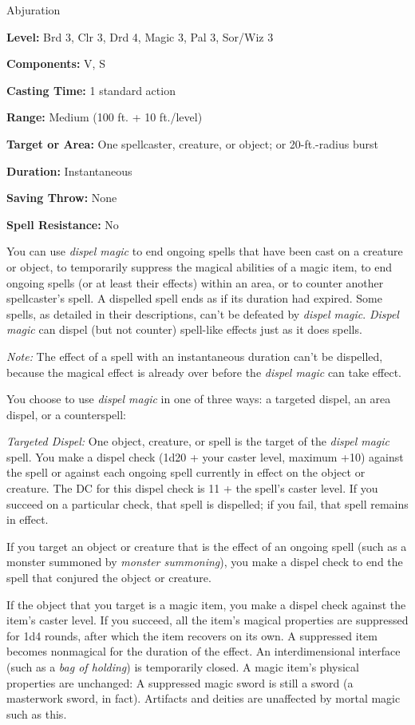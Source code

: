 
Abjuration

\textbf{Level:} Brd 3, Clr 3, Drd 4, Magic 3, Pal 3, Sor/Wiz 3

\textbf{Components:} V, S

\textbf{Casting Time:} 1 standard action

\textbf{Range:} Medium (100 ft. + 10 ft./level)

\textbf{Target or Area:} One spellcaster, creature, or object; or 20-ft.-radius 
burst

\textbf{Duration:} Instantaneous

\textbf{Saving Throw:} None

\textbf{Spell Resistance:} No

You can use \textit{dispel magic} to end ongoing spells that have been cast on 
a creature or object, to temporarily suppress the magical abilities of a magic 
item, to end ongoing spells (or at least their effects) within an area, or to counter 
another spellcaster's spell. A dispelled spell ends as if its duration had expired. 
Some spells, as detailed in their descriptions, can't be defeated by \textit{dispel 
magic}. \textit{Dispel magic} can dispel (but not counter) spell-like effects just 
as it does spells.

\textit{Note:} The effect of a spell with an instantaneous duration can't be dispelled, 
because the magical effect is already over before the \textit{dispel magic} can 
take effect. 

You choose to use \textit{dispel magic} in one of three ways: a targeted dispel, 
an area dispel, or a counterspell:

\textit{Targeted Dispel:} One object, creature, or spell is the target of the \textit{dispel 
magic} spell. You make a dispel check (1d20 + your caster level, maximum +10) against 
the spell or against each ongoing spell currently in effect on the object or creature. 
The DC for this dispel check is 11 + the spell's caster level. If you succeed on 
a particular check, that spell is dispelled; if you fail, that spell remains in 
effect.

If you target an object or creature that is the effect of an ongoing spell (such 
as a monster summoned by \textit{monster summoning}), you make a dispel check to 
end the spell that conjured the object or creature.

If the object that you target is a magic item, you make a dispel check against 
the item's caster level. If you succeed, all the item's magical properties are 
suppressed for 1d4 rounds, after which the item recovers on its own. A suppressed 
item becomes nonmagical for the duration of the effect. An interdimensional interface 
(such as a \textit{bag of holding}) is temporarily closed. A magic item's physical 
properties are unchanged: A suppressed magic sword is still a sword (a masterwork 
sword, in fact). Artifacts and deities are unaffected by mortal magic such as this.

